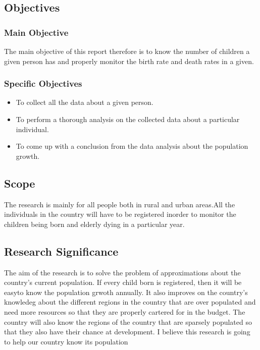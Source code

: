 \documentclass[options]{article}
\begin{document}
\subsection{\textbf{Objectives}}


\subsubsection{\textbf{Main Objective}} 
The main objective of this report therefore is to know the number of children a given person has and properly monitor the birth rate and death rates in a given.

\subsubsection{\textbf{Specific Objectives}}

\begin{itemize}
  \item To collect all the data about a given person. 
  \item To perform a thorough analysis on the collected data about a particular individual.
  \item To come up with a conclusion from the data analysis about the population growth.
\end{itemize}


\subsection{\textbf{Scope}}
The research is mainly for all people  both in rural and urban areas.All the individuals in the country will have to be registered inorder to monitor the children being born and elderly dying in a particular year.

\subsection{\textbf{Research Significance}}
The aim of the research is to  solve the problem of approximations about the country's current population. If every child born is registered, then it will be easyto know the population grwoth annually. It also improves on the country's knowledeg about the different regions in the country that are over populated and need more resources so that they are properly cartered for in the budget. The country will also know the regions of the country that are sparsely populated so that they also have their chance at development. I believe this research is going to help our country know its population
\end{document}
